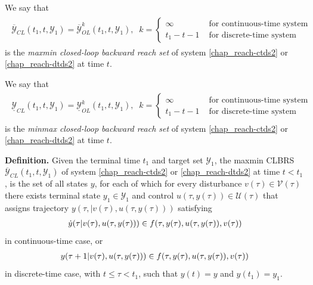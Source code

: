 \documentclass[letterpaper,10pt,english]{sphinxmanual}
\begin{document}
We say that
\label{chap_reach:equation-maxminclbrs}\begin{gather}
\begin{split}\overline{{\mathcal Y}}_{CL}(t_1, t, {\mathcal Y}_1) = \overline{{\mathcal Y}}_{OL}^k(t_1, t, {\mathcal Y}_1), \;\;
k = \left\{\begin{array}{ll}
\infty & \mbox{ for continuous-time system}\\
t_1-t-1 & \mbox{ for discrete-time system}\end{array}\right.\end{split}\label{chap_reach-maxminclbrs}
\end{gather}
is the \emph{maxmin closed-loop backward reach set} of system \eqref{chap_reach-ctds2} or
\eqref{chap_reach-dtds2} at time $t$.

We say that
\label{chap_reach:equation-minmaxclbrs}\begin{gather}
\begin{split}\underline{{\mathcal Y}}_{CL}(t_1, t, {\mathcal Y}_1) = \underline{{\mathcal Y}}_{OL}^k(t_1, t, {\mathcal Y}_1), \;\;
k = \left\{\begin{array}{ll}
\infty & \mbox{ for continuous-time system}\\
t_1-t-1 & \mbox{ for discrete-time system}\end{array}\right.\end{split}\label{chap_reach-minmaxclbrs}
\end{gather}
is the \emph{minmax closed-loop backward reach set} of system \eqref{chap_reach-ctds2} or
\eqref{chap_reach-dtds2} at time $t$.

\textbf{Definition.} Given the terminal time $t_1$ and
target set ${\mathcal Y}_1$, the maxmin CLBRS
$\overline{{\mathcal Y}}_{CL}(t_1, t, {\mathcal Y}_1)$ of system
\eqref{chap_reach-ctds2} or \eqref{chap_reach-dtds2} at time $t<t_1$, is the set of all states
$y$, for each of which for every disturbance
$v(\tau)\in{\mathcal V}(\tau)$ there exists terminal state
$y_1\in{\mathcal Y}_1$ and control
$u(\tau, y(\tau))\in{\mathcal U}(\tau)$ that assigns trajectory
$y(\tau, | v(\tau), u(\tau, y(\tau)))$ satisfying
\begin{gather}
\begin{split}\dot{y}(\tau | v(\tau), u(\tau, y(\tau))) \in
f(\tau, y(\tau), u(\tau, y(\tau)), v(\tau))\end{split}\notag
\end{gather}
in continuous-time case, or
\begin{gather}
\begin{split}y(\tau+1 | v(\tau), u(\tau, y(\tau))) \in
f(\tau, y(\tau), u(\tau, y(\tau)), v(\tau))\end{split}\notag
\end{gather}
in discrete-time case, with $t\leqslant\tau<t_1$, such that
$y(t) = y$ and $y(t_1)=y_1$.
\end{document}
